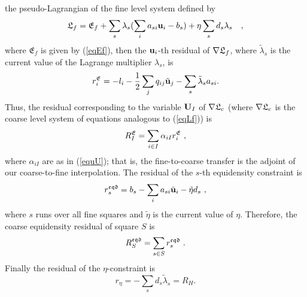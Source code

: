 \documentclass[final]{siamltex}
\begin{document}
the pseudo-Lagrangian of the fine level system defined by
\begin{align}\label{eqLf}
\mathfrak{L}_f=\mathfrak{E}_f+\sum_s \lambda_s(\sum_ia_{si}{\bf u}_i-b_s)+\eta
\sum_s d_s\lambda_s~~~,
\end{align}
where $\mathfrak{E}_f$ is given by (\ref{eqEf}), then the
${\bf u}_i$-th residual of $\nabla \mathfrak{L}_f$, where
$\tilde{\lambda}_s$ is the current value of the Lagrange
multiplier ${\lambda}_s$, is
\[
r_i^{\mathfrak{E}}=-l_i - \frac{1}{2}\sum_j q_{ij}\tilde{{\bf u}}_j - \sum_s
\tilde{\lambda}_s a_{si}.
\]
Thus, the residual corresponding to the variable ${\bf U}_I$ of
$\nabla \mathfrak{L}_c$ (where $\nabla \mathfrak{L}_c$ is the coarse level system
of equations analogous to (\ref{eqLf})) is
\begin{equation}\label{RI}
R_I^{\mathfrak{E}}=
\sum_{i\in I} \alpha_{iI}r_i^{\mathfrak{E}}~,
\end{equation}
where
$\alpha_{iI}$ are as in (\ref{equU}); that is, the fine-to-coarse
transfer is the adjoint of our coarse-to-fine interpolation. The
residual of the $s$-th equidensity constraint is
\[
r_s^{\mathfrak{eqd}}=b_s - \sum_ia_{si}\tilde{{\bf u}}_i - \tilde{\eta} d_s~,
\]
where $s$ runs over all fine squares and $\tilde{\eta}$ is the
current value of ${\eta}$. Therefore, the coarse equidensity
residual of square $S$ is
\begin{equation}\label{RS}
R_S^{\mathfrak{eqd}}=
\sum_{s\in S}r_s^{\mathfrak{eqd}}~.
\end{equation}
Finally the residual of the $\eta$-constraint is
\[
r_{\eta}=-\sum_s d_s\tilde{\lambda}_s=R_H.
\]
\end{document}
